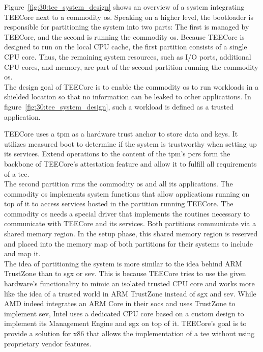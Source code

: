 Figure~\ref{fig:30:tee_system_design} shows an overview of a system integrating
TEECore next to a commodity \gls{os}. Speaking on a higher level, the bootloader
is responsible for partitioning the system into two parts: The first is managed
by TEECore, and the second is running the commodity \gls{os}. Because TEECore is
designed to run on the local CPU cache, the first partition consists of a single
CPU core. Thus, the remaining system resources, such as I/O ports, additional
CPU cores, and memory, are part of the second partition running the commodity
\gls{os}.\\

The design goal of TEECore is to enable the commodity \gls{os} to run workloads
in a shielded location so that no information can be leaked to other
applications. In figure~\ref{fig:30:tee_system_design}, such a workload is
defined as a trusted application.

TEECore uses a \gls{tpm} as a hardware trust anchor to store data and keys. It
utilizes measured boot to determine if the system is trustworthy when setting up
its services. Extend operations to the content of the \gls{tpm}'s \glspl{pcr}
form the backbone of TEECore's attestation feature and allow it to fulfill all
requirements of a \gls{tee}.\\

The second partition runs the commodity \gls{os} and all its applications. The
commodity \gls{os} implements system functions that allow applications running
on top of it to access services hosted in the partition running TEECore. The
commodity \gls{os} needs a special driver that implements the routines necessary
to communicate with TEECore and its services. Both partitions communicate via a
shared memory region. In the setup phase, this shared memory region is reserved
and placed into the memory map of both partitions for their systems to include
and map it.\\

The idea of partitioning the system is more similar to the idea behind ARM
TrustZone than to \gls{sgx} or \gls{sev}. This is because TEECore
tries to use the given hardware's functionality to mimic an isolated trusted CPU
core and works more like the idea of a trusted world in ARM TrustZone instead of
\gls{sgx} and \gls{sev}. While AMD indeed integrates an ARM Core in their
\glspl{soc} and uses TrustZone to implement \gls{sev}, Intel uses a dedicated
CPU core based on a custom design to implement its Management Engine and
\gls{sgx} on top of it. TEECore's goal is to provide a solution for
x86 that allows the implementation of a \gls{tee} without using proprietary
vendor features.

